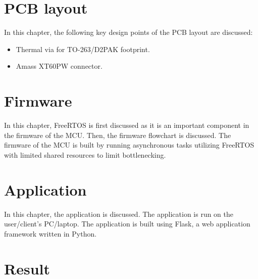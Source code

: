 \documentclass[12pt,letterpaper]{report}
\begin{document}
\chapter{PCB layout}
\justify
In this chapter, the following key design points of the PCB layout are discussed:
\begin{itemize}
  \item Thermal via for TO-263/D2PAK footprint.
  \item Amass XT60PW connector.
\end{itemize}
\pagebreak


\chapter{Firmware}
\justify
In this chapter, FreeRTOS is first discussed as it is an important component in the firmware of the MCU. Then, the firmware flowchart is discussed. The firmware of the MCU is built by running asynchronous tasks utilizing FreeRTOS with limited shared resources to limit bottlenecking.
\pagebreak


\chapter{Application}
\justify
In this chapter, the application is discussed. The application is run on the user/client's PC/laptop. The application is built using Flask, a web application framework written in Python.
\pagebreak


\chapter{Result}

\printbibliography
\end{document}

